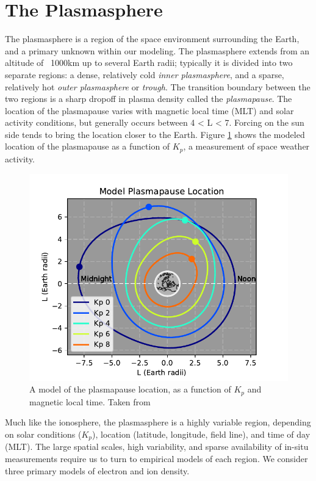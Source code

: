 \section{The Plasmasphere}
The plasmasphere is a region of the space environment surrounding the Earth, and a primary unknown within our modeling. The plasmasphere extends from an altitude of ~1000km up to several Earth radii; typically it is divided into two separate regions: a dense, relatively cold \emph{inner plasmasphere}, and a sparse, relatively hot \emph{outer plasmasphere} or \emph{trough}. The transition boundary between the two regions is a sharp dropoff in plasma density called the \emph{plasmapause}. The location of the plasmapause varies with magnetic local time (MLT) and solar activity conditions, but generally occurs between 4 < L < 7. Forcing on the sun side tends to bring the location closer to the Earth. Figure \ref{fig:plasmapause} shows the modeled location of the plasmapause as a function of $K_p$, a measurement of space weather activity.

\begin{figure}[h]
\begin{center}
\includegraphics{figures/plasmapause}
\caption[Model of plasmapause location]{A model of the plasmapause location, as a function of $K_p$ and magnetic local time. Taken from \citep{Gallagher1999}}
\label{fig:plasmapause}
\end{center}
\end{figure}


Much like the ionosphere, the plasmasphere is a highly variable region, depending on solar conditions ($K_p$), location (latitude, longitude, field line), and time of day (MLT). The large spatial scales, high variability, and sparse availability of in-situ measurements require us to turn to empirical models of each region. We consider three primary models of electron and ion density.

